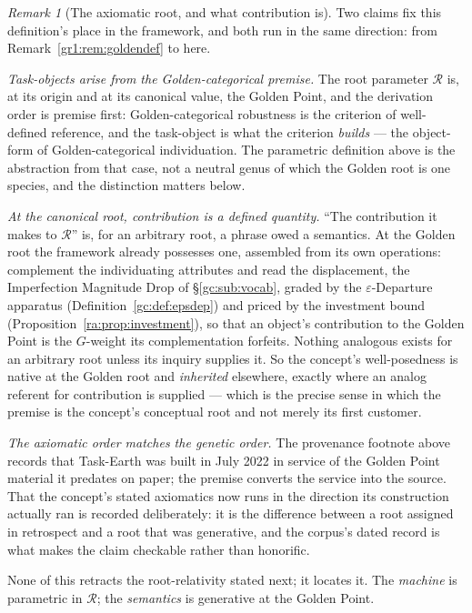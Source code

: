 \documentclass[11pt]{article}
\numberwithin{equation}{section}
\theoremstyle{plain}
\theoremstyle{definition}
\theoremstyle{remark}
\newtheorem{remark}[theorem]{Remark}
\begin{document}
\begin{remark}[The axiomatic root, and what contribution is]
\label{to:rem:goldenroot}
Two claims fix this definition's place in the framework, and both run
in the same direction: from Remark~\ref{gr1:rem:goldendef} to here.

\emph{Task-objects arise from the Golden-categorical premise.} The
root parameter $\mathcal R$ is, at its origin and at its canonical
value, the Golden Point, and the derivation order is premise first:
Golden-categorical robustness is the criterion of well-defined
reference, and the task-object is what the criterion \emph{builds}
--- the object-form of Golden-categorical individuation. The
parametric definition above is the abstraction from that case, not a
neutral genus of which the Golden root is one species, and the
distinction matters below.

\emph{At the canonical root, contribution is a defined quantity.}
``The contribution it makes to $\mathcal R$'' is, for an arbitrary
root, a phrase owed a semantics. At the Golden root the framework
already possesses one, assembled from its own operations: complement
the individuating attributes and read the displacement, the
Imperfection Magnitude Drop of \S\ref{gc:sub:vocab}, graded by the
$\varepsilon$-Departure apparatus (Definition~\ref{gc:def:epsdep})
and priced by the investment bound
(Proposition~\ref{ra:prop:investment}), so that an object's
contribution to the Golden Point is the $G$-weight its complementation
forfeits. Nothing analogous exists for an arbitrary root unless its
inquiry supplies it. So the concept's well-posedness is native at the
Golden root and \emph{inherited} elsewhere, exactly where an analog
referent for contribution is supplied --- which is the precise sense
in which the premise is the concept's conceptual root and not merely
its first customer.

\emph{The axiomatic order matches the genetic order.} The provenance
footnote above records that Task-Earth was built in July 2022 in
service of the Golden Point material it predates on paper; the premise
converts the service into the source. That the concept's stated
axiomatics now runs in the direction its construction actually ran is
recorded deliberately: it is the difference between a root assigned in
retrospect and a root that was generative, and the corpus's dated
record is what makes the claim checkable rather than honorific.

None of this retracts the root-relativity stated next; it locates it.
The \emph{machine} is parametric in $\mathcal R$; the
\emph{semantics} is generative at the Golden Point.
\end{remark}
\end{document}

